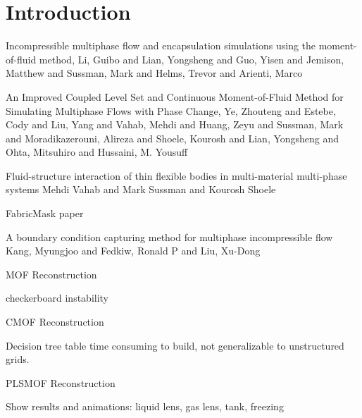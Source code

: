 \documentclass[preprint,12pt]{Definitions/elsarticle}
\begin{document}
\section{Introduction}

\par\noindent
Incompressible multiphase flow and encapsulation simulations using the moment-of-fluid method, Li, Guibo and Lian, Yongsheng and Guo, Yisen and Jemison, Matthew and Sussman, Mark and Helms, Trevor and Arienti, Marco
\par\noindent
An {Improved} {Coupled} {Level} {Set} and {Continuous} {Moment}-of-{Fluid} {Method} for {Simulating} {Multiphase} {Flows} with {Phase} {Change},
Ye, Zhouteng and Estebe, Cody and Liu, Yang and Vahab, Mehdi and Huang, Zeyu and Sussman, Mark and Moradikazerouni, Alireza and Shoele, Kourosh and Lian, Yongsheng and Ohta, Mitsuhiro and Hussaini, M. Yousuff
\par\noindent
Fluid-structure interaction of thin flexible bodies in multi-material multi-phase systems
Mehdi Vahab and Mark Sussman and Kourosh Shoele
\par\noindent
FabricMask paper
\par\noindent

A boundary condition capturing method for multiphase incompressible flow
Kang, Myungjoo and Fedkiw, Ronald P and Liu, Xu-Dong
\par\noindent
MOF Reconstruction
\par\noindent
checkerboard instability
\par\noindent
CMOF Reconstruction
\par\noindent
Decision tree table time consuming to build, not generalizable to 
unstructured grids.
\par\noindent
PLSMOF Reconstruction
\par\noindent
Show results and animations: liquid lens, gas lens, tank, freezing
\end{document}
